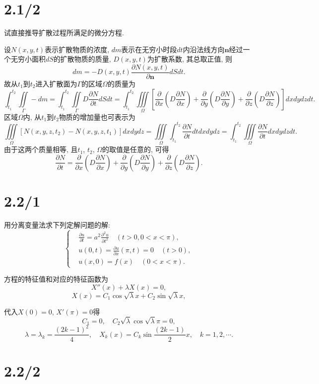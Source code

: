 \documentclass[11pt,a4paper]{article}
\begin{document}
\section{2.1/2}
\begin{problem}
试直接推导扩散过程所满足的微分方程.
\end{problem}
设$N(x,y,t)$表示扩散物质的浓度, $dm$表示在无穷小时段$dt$内沿法线方向$\mathbf{n}$经过一个无穷小面积$dS$的扩散物质的质量, $D(x,y,t)$为扩散系数, 其总取正值, 则
$$dm=-D(x,y,t)\frac{\partial N(x,y,t)}{\partial \mathbf{n}}dSdt.$$
故从$t_1$到$t_2$进入扩散面为$\Gamma$的区域$\Omega$的质量为
$$\int_{t_1}^{t_2}\iint\limits_{\Gamma}-dm=\int_{t_1}^{t_2}\iint\limits_{\Gamma}D\frac{\partial N}{\partial t}dSdt=\int_{t_1}^{t_2}\iiint\limits_{\Omega}\left[\frac{\partial}{\partial x}\left(D\frac{\partial N}{\partial x}\right)+\frac{\partial}{\partial y}\left(D\frac{\partial N}{\partial y}\right)+\frac{\partial}{\partial z}\left(D\frac{\partial N}{\partial z}\right)\right]dxdydzdt.$$
区域$\Omega$内, 从$t_1$到$t_2$物质的增加量也可表示为
$$\iiint\limits_{\Omega}\left[N(x,y,z,t_2)-N(x,y,z,t_1)\right]dxdydz=\iiint\limits_{\Omega}\int_{t_1}^{t_2}\frac{\partial N}{\partial t}dtdxdydz=\int_{t_1}^{t_2}\iiint\limits_{\Omega}\frac{\partial N}{\partial t}dxdydzdt.$$
由于这两个质量相等, 且$t_1$, $t_2$, $\Omega$的取值是任意的, 可得
$$\frac{\partial N}{\partial t}=\frac{\partial}{\partial x}\left(D\frac{\partial N}{\partial x}\right)+\frac{\partial}{\partial y}\left(D\frac{\partial N}{\partial y}\right)+\frac{\partial}{\partial z}\left(D\frac{\partial N}{\partial z}\right).$$

\section{2.2/1}
\begin{problem}
用分离变量法求下列定解问题的解:
$$\left\{\begin{aligned}
     & \frac{\partial u}{\partial t}=a^2\frac{\partial^2u}{\partial t^2}\quad (t>0,0<x<\pi), \\
     & u(0,t)=\frac{\partial u}{\partial x}(\pi,t)=0\quad (t>0),                             \\
     & u(x,0)=f(x)\quad (0<x<\pi).
  \end{aligned}\right.$$
\end{problem}

方程的特征值和对应的特征函数为
$$X''(x)+\lambda X(x)=0,$$
$$X(x)=C_1\cos\sqrt{\lambda}x+C_2\sin\sqrt{\lambda}x,$$

代入$X(0)=0$, $X'(\pi)=0$得
$$C_1=0,\quad C_2\sqrt{\lambda}\cos\sqrt{\lambda}\pi=0,$$
$$\lambda=\lambda_k=\frac{(2k-1)^2}{4},\quad X_k(x)=C_k\sin\frac{(2k-1)}{2}x,\quad k=1,2,\cdots.$$

\section{2.2/2}
\end{document}
